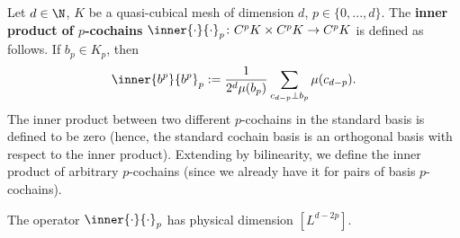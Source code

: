 \begin{definition}
  Let
    $d \in \N$,
    $K$ be a quasi-cubical mesh of dimension $d$,
    $p \in \{0, ..., d\}$.
  The \textbf{inner product of $p$-cochains}
  $\inner{\cdot}{\cdot}_p \colon C^p K \times C^p K \to C^p K$
  is defined as follows.
  If $b_p \in K_p$, then
  \begin{equation}
    \inner{b^p}{b^p}_p :=
    \frac{1}{2^d \mu(b_p)} \sum_{c_{d - p} \perp b_p} \mu(c_{d - p}).
  \end{equation}
  The inner product between two different $p$-cochains in the standard basis is
  defined to be zero
  (hence, the standard cochain basis is an orthogonal basis with respect to the
  inner product).
  Extending by bilinearity, we define the inner product of arbitrary
  $p$-cochains (since we already have it for pairs of basis $p$-cochains).

  The operator $\inner{\cdot}{\cdot}_p$ has physical dimension $[L^{d - 2 p}]$.
\end{definition}

